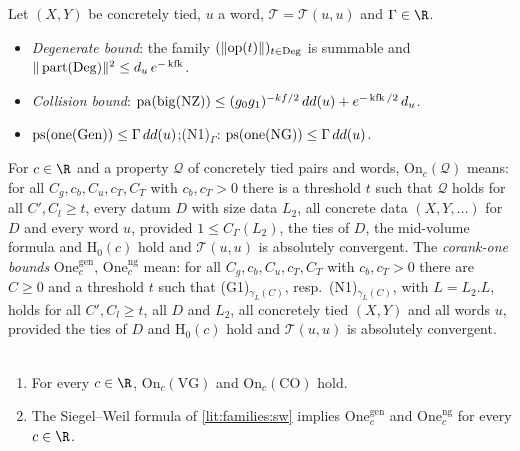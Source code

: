 \begin{definition}\label{pf:open0:def:points}
Let $(X,Y)$ be concretely tied, $u$ a word, $\mathcal T=\mathcal T(u,u)$ and $\Gamma\in\R$.
\begin{itemize}
\item[(VG)] \emph{Degenerate bound}: the family $(\|\mathrm{op}(t)\|)_{t\in\mathrm{Deg}}$ is summable and
$\|\operatorname{part}(\mathrm{Deg})\|^2\le d_u\,e^{-\operatorname{kfk}}$.
\item[(CO)] \emph{Collision bound}: $\operatorname{pa}(\operatorname{big}(\mathrm{NZ}))\le(g_0g_1)^{-kf/2}\,dd(u)+e^{-\operatorname{kfk}/2}\,d_u$.
\item[(G1)$_\Gamma$] $\operatorname{ps}(\operatorname{one}(\mathrm{Gen}))\le\Gamma\,dd(u)$;\qquad (N1)$_\Gamma$:
$\operatorname{ps}(\operatorname{one}(\mathrm{NG}))\le\Gamma\,dd(u)$.
\end{itemize}
For $c\in\R$ and a property $\mathcal Q$ of concretely tied pairs and words, $\mathrm{On}_c(\mathcal Q)$ means: for all
$C_g,c_b,C_u,c_T,C_T$ with $c_b,c_T>0$ there is a threshold $t$ such that $\mathcal Q$ holds for all $C',C_l\ge t$, every datum $D$
with size data $L_2$, all concrete data $(X,Y,\dots)$ for $D$ and every word $u$, provided $1\le C_\Gamma(L_2)$, the ties of $D$, the
mid-volume formula and $\mathrm{H}_0(c)$ hold and $\mathcal T(u,u)$ is absolutely convergent. The \emph{corank-one bounds}
$\mathrm{One}^{\mathrm{gen}}_c$, $\mathrm{One}^{\mathrm{ng}}_c$ mean: for all $C_g,c_b,C_u,c_T,C_T$ with $c_b,c_T>0$ there are $C\ge0$
and a threshold $t$ such that (G1)$_{\gamma_L(C)}$, resp.\ (N1)$_{\gamma_L(C)}$, with $L=L_2.L$, holds for all $C',C_l\ge t$, all
$D$ and $L_2$, all concretely tied $(X,Y)$ and all words $u$, provided the ties of $D$ and $\mathrm{H}_0(c)$ hold and
$\mathcal T(u,u)$ is absolutely convergent.
\ \
\ 
\end{definition}

\begin{theorem}[The four point bounds]\label{pf:open0:fourpoints}
\begin{enumerate}[label=(\alph*)]
\item For every $c\in\R$, $\mathrm{On}_c(\mathrm{VG})$ and $\mathrm{On}_c(\mathrm{CO})$ hold.
\item The Siegel--Weil formula of \cref{lit:families:sw} implies $\mathrm{One}^{\mathrm{gen}}_c$ and $\mathrm{One}^{\mathrm{ng}}_c$
for every $c\in\R$.
\end{enumerate}
\
\
\
\
\end{theorem}


